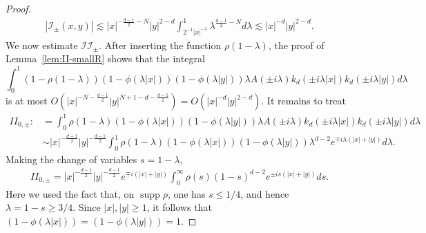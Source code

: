 \documentclass[12pt]{amsart}
\begin{document}
\begin{proof}
\begin{align*}
    |\mathcal{I}_{\pm}(x,y)| \lesssim |x|^{-\frac{d-1}{2}-N} |y|^{2-d} \int_{2^{-1}|x|^{-1}}^1 \lambda^{\frac{d-1}{2}-N} d\lambda \lesssim |x|^{-d} |y|^{2-d}.
\end{align*}
We now estimate $\mathcal{II}_{\pm}$. After inserting the function $\rho(1-\lambda)$, the proof of Lemma~\ref{lem:II-smallR} shows that the integral 
\begin{equation*}
\int_0^1 (1-\rho(1-\lambda)) (1-\phi(\lambda |x|) ) (1-\phi(\lambda |y|) ) \lambda A(\pm i \lambda) k_d(\pm i \lambda  |x|) k_d (\pm i \lambda  |y|) d\lambda
\end{equation*}
is at most $O\left( |x|^{-N-\frac{d-1}{2}} |y|^{N+1-d-\frac{d-1}{2}} \right) = O(|x|^{-d} |y|^{2-d})$. It remains to treat
\begin{align*}
    II_{0,\pm} :&= \int_0^1 \rho(1-\lambda) (1-\phi(\lambda |x|)) (1-\phi(\lambda |y|)) \lambda A(\pm i \lambda) k_d(\pm i \lambda  |x|) k_d (\pm i \lambda |y|) d\lambda\\
    &\sim |x|^{-\frac{d-1}{2}} |y|^{-\frac{d-1}{2}} \int_0^1 \rho(1-\lambda)
(1-\phi(\lambda |x|))(1-\phi(\lambda |y|))
\lambda^{d-2}
e^{\mp i\lambda (|x|+|y|)} d\lambda.
\end{align*}
Making the change of variables $s=1-\lambda$, 
\begin{align*}
    II_{0,\pm} =|x|^{-\frac{d-1}{2}} |y|^{-\frac{d-1}{2}}  e^{\mp i (|x|+|y|)} \int_0^\infty \rho(s) (1-s)^{d-2} e^{\pm is(|x|+|y|)} ds.
\end{align*}
Here we  used the fact that, on \(\operatorname{supp}\rho\), one has \(s\le1/4\), and hence
\(\lambda=1-s\ge3/4\). Since \(|x|,|y|\ge1\), it follows that
$(1-\phi(\lambda |x|)) = (1-\phi(\lambda |y|))=1$.



\end{proof}
\end{document}
